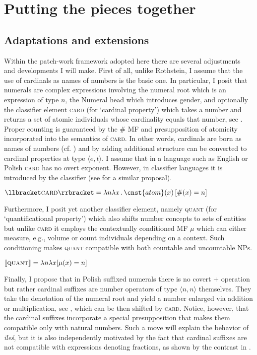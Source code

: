 \documentclass[output=paper,
]{langscibook}
\begin{document}
	\section{Putting the pieces together}\label{sec:putting-pieces-together}
	
	\subsection{Adaptations and extensions}\label{sec:adaptations-and-extensions}
	
	
	Within the patch-work framework adopted here there are several adjustments and developments I will make. First of all, unlike Rothstein, I assume that the use of cardinals as names of numbers is the basic one. In particular, I posit that numerals are complex expressions involving the numeral root which is an expression of type $n$, the Numeral head which introduces gender, and optionally the classifier element \textsc{card} (for `cardinal property') which takes a number and returns a set of atomic individuals whose cardinality equals that number, see . Proper counting is guaranteed by the $\#$ MF and presupposition of atomicity incorporated into the semantics of \textsc{card}. In other words, cardinals are born as names of numbers (cf. \citealt{scha1981distributive}) and by adding additional structure can be converted to cardinal properties at type $\langle e,t\rangle$. I assume that in a language such as English or Polish \textsc{card} has no overt exponent. However, in classifier languages it is introduced by the classifier (see \citealt{sudo2016semantic} for a similar proposal).

	\ea $\llbracket\textsc{card}\rrbracket=\lambda n\lambda x\,.\,\cnst{atom}(x)\,[\#(x)=n]$\label{ex:card}
	\z

\noindent Furthermore, I posit yet another classifier element, namely \textsc{quant} (for `quantificational property') which also shifts number concepts to sets of entities but unlike \textsc{card} it employs the contextually conditioned MF $\mu$ which can either measure, e.g., volume or count individuals depending on a context. Such conditioning makes \textsc{quant} compatible with both countable and uncountable NPs.

	\ea $\llbracket\textsc{quant}\rrbracket=\lambda n\lambda x[\mu(x)=n]$\label{ex:quant}
	\z

\noindent Finally, I propose that in Polish suffixed numerals there is no covert $+$ operation but rather cardinal suffixes are number operators of type $\langle n,n\rangle$ themselves. They take the denotation of the numeral root and yield a number enlarged via addition or multiplication, see , which can be then shifted by \textsc{card}. Notice, however, that the cardinal suffixes incorporate a special presupposition that makes them compatible only with natural numbers. Such a move will explain the behavior of \textit{ileś}, but it is also independently motivated by the fact that cardinal suffixes are not compatible with expressions denoting fractions, as shown by the contrast in .
\end{document}
